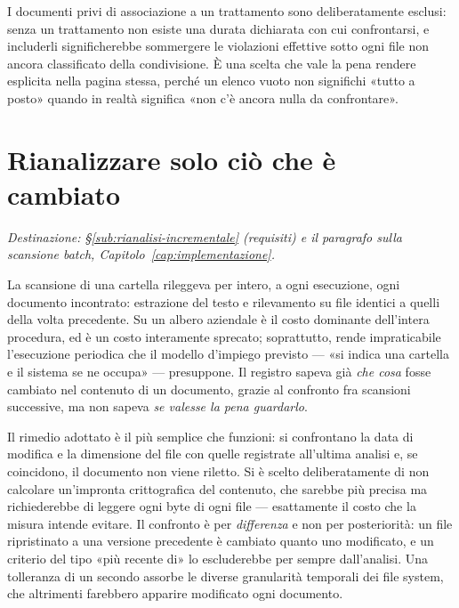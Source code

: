 I documenti privi di associazione a un trattamento sono deliberatamente esclusi: senza un trattamento non esiste una durata dichiarata con cui confrontarsi, e includerli significherebbe sommergere le violazioni effettive sotto ogni file non ancora classificato della condivisione. È una scelta che vale la pena rendere esplicita nella pagina stessa, perché un elenco vuoto non significhi «tutto a posto» quando in realtà significa «non c'è ancora nulla da confrontare».

\section{Rianalizzare solo ciò che è cambiato}
\label{sec:sv-scansione-incrementale}

\textit{Destinazione: §\ref{sub:rianalisi-incrementale} (requisiti) e il paragrafo sulla scansione batch, Capitolo~\ref{cap:implementazione}.} \medskip

La scansione di una cartella rileggeva per intero, a ogni esecuzione, ogni documento incontrato: estrazione del testo e rilevamento su file identici a quelli della volta precedente. Su un albero aziendale è il costo dominante dell'intera procedura, ed è un costo interamente sprecato; soprattutto, rende impraticabile l'esecuzione periodica che il modello d'impiego previsto --- «si indica una cartella e il sistema se ne occupa» --- presuppone. Il registro sapeva già \emph{che cosa} fosse cambiato nel contenuto di un documento, grazie al confronto fra scansioni successive, ma non sapeva \emph{se valesse la pena guardarlo}. \medskip

Il rimedio adottato è il più semplice che funzioni: si confrontano la data di modifica e la dimensione del file con quelle registrate all'ultima analisi e, se coincidono, il documento non viene riletto. Si è scelto deliberatamente di non calcolare un'impronta crittografica del contenuto, che sarebbe più precisa ma richiederebbe di leggere ogni byte di ogni file --- esattamente il costo che la misura intende evitare. Il confronto è per \emph{differenza} e non per posteriorità: un file ripristinato a una versione precedente è cambiato quanto uno modificato, e un criterio del tipo «più recente di» lo escluderebbe per sempre dall'analisi. Una tolleranza di un secondo assorbe le diverse granularità temporali dei file system, che altrimenti farebbero apparire modificato ogni documento. \medskip

